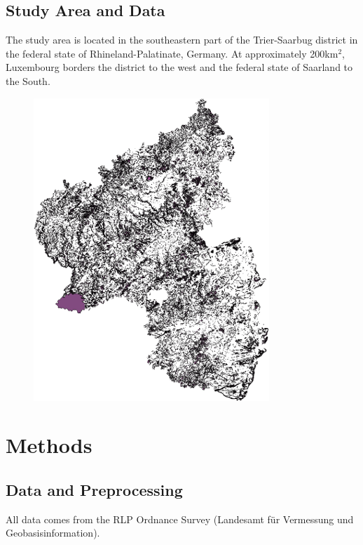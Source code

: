 \documentclass[authoryear, review,12pt,number]{elsarticle}
\begin{document}
\subsection{Study Area and Data}
The study area is located in the southeastern part of the Trier-Saarbug district
in the federal state of Rhineland-Palatinate, Germany. At approximately
200km$^{2}$, Luxembourg borders the district to the west and the federal state
of Saarland to the South.
\begin{figure}
	\includegraphics[width=\textwidth]{diagrams/study_area_small.png}
\end{figure}
\section{Methods}
\subsection{Data and Preprocessing}
All data comes from the RLP Ordnance Survey (Landesamt f\"ur Vermessung und
Geobasisinformation).
\end{document}
